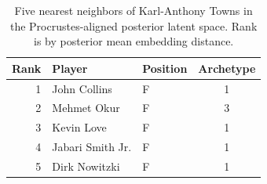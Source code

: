 \begin{table}[htbp]
  \centering\small
  \begin{tabular}{rllc}
    \toprule
    Rank & Player & Position & Archetype \\
    \midrule
    1 & John Collins & F & 1 \\
    2 & Mehmet Okur & F & 3 \\
    3 & Kevin Love & F & 1 \\
    4 & Jabari Smith Jr. & F & 1 \\
    5 & Dirk Nowitzki & F & 1 \\
    \bottomrule
  \end{tabular}
  \caption{Five nearest neighbors of Karl-Anthony Towns in the Procrustes-aligned posterior latent space. Rank is by posterior mean embedding distance.}
  \label{tab:Karl_Anthony_Towns_neighbors}
\end{table}

